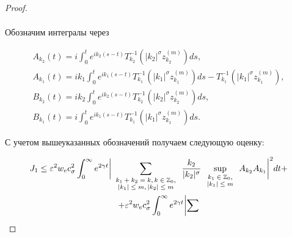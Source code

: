 \begin{proof}
\begin{multline*}
\end{multline*}

Обозначим интегралы через

\begin{gather*}

A_{k_2}(t)=i\int_0^t e^{ik_2(s-t)}T^{-1}_{k_2}(|k_2|^\sigma z_{k_2}^{(m)})ds,

\\

A_{k_1}(t)=ik_1\int_0^t e^{ik_1(s-t)}T^{-1}_{k_1}(|k_1|^\sigma z_{k_1}^{(m)})ds-T^{-1}_{k_1}(|k_1|^\sigma z_{k_1}^{(m)}),

\\

B_{k_2}(t)=ik_2 \int_0^t e^{ik_2(s-t)}T^{-1}_{k_2}(|k_2|^\sigma z_{k_2}^{(m)})ds,

\\

B_{k_1}(t)=i\int_0^t e^{ik_1(s-t)}T^{-1}_{k_1}(|k_1|^\sigma z_{k_1}^{(m)})ds.

\end{gather*}

С учетом вышеуказанных обозначений получаем следующую оценку:

\begin{multline}

J_1\le\varepsilon^2 w_e c_\sigma^2\int_0^\infty e^{2\gamma t}

\biggl|

\sum_{

\scriptsize

\begin{array}{c}

k_1+k_2=k, k\in \mathbb Z_0,\\ 

|k_1|\le m,|k_2|\le m

\end{array}

}\frac{k_2}{|k_2|^\sigma} \sup_{\scriptsize \begin{array}{c} k_1\in \mathbb Z_0, \\ |k_1|\le m \end{array}} A_{k_2}A_{k_1}\biggr|^2dt+

\\

+\varepsilon^2 w_e c_\sigma^2\int_0^\infty e^{2\gamma t} 

\biggl|

\sum_{

\scriptsize

\begin{array}{c}


\end{array}}
\end{multline}
\end{proof}
